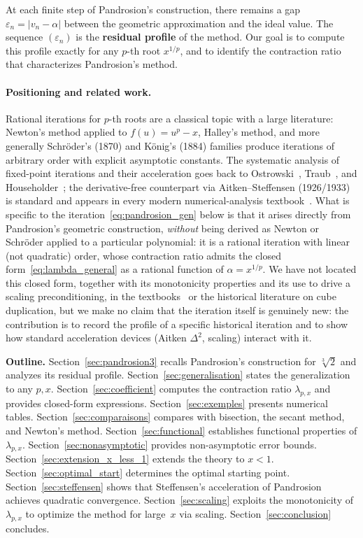 \documentclass[11pt,a4paper]{article}
\theoremstyle{definition}
\newcommand{\cbrt}[1]{\sqrt[3]{#1}}
\newcommand{\eps}{\varepsilon}
\begin{document}
At each finite step of Pandrosion's construction, there remains a gap $\eps_n = |v_n - \alpha|$ between the geometric approximation and the ideal value. The sequence $(\eps_n)$ is the \textbf{residual profile} of the method. Our goal is to compute this profile exactly for any $p$-th root $x^{1/p}$, and to identify the contraction ratio that characterizes Pandrosion's method.

\medskip

\paragraph{Positioning and related work.}
Rational iterations for $p$-th roots are a classical topic with a large literature: Newton's method applied to $f(u) = u^p - x$, Halley's method, and more generally Schröder's (1870) and König's (1884) families produce iterations of arbitrary order with explicit asymptotic constants. The systematic analysis of fixed-point iterations and their acceleration goes back to Ostrowski~\cite{ostrowski}, Traub~\cite{traub}, and Householder~\cite{householder}; the derivative-free counterpart via Aitken--Steffensen (1926/1933) is standard and appears in every modern numerical-analysis textbook~\cite{stoer,numrecipes}.
What is specific to the iteration~\eqref{eq:pandrosion_gen} below is that it arises directly from Pandrosion's geometric construction, \emph{without} being derived as Newton or Schröder applied to a particular polynomial: it is a rational iteration with linear (not quadratic) order, whose contraction ratio admits the closed form~\eqref{eq:lambda_general} as a rational function of $\alpha = x^{1/p}$.
We have not located this closed form, together with its monotonicity properties and its use to drive a scaling preconditioning, in the textbooks~\cite{stoer,numrecipes} or the historical literature on cube duplication, but we make no claim that the iteration itself is genuinely new: the contribution is to record the profile of a specific historical iteration and to show how standard acceleration devices (Aitken $\Delta^2$, scaling) interact with it.

\medskip

\textbf{Outline.} Section~\ref{sec:pandrosion3} recalls Pandrosion's construction for $\cbrt{2}$ and analyzes its residual profile. Section~\ref{sec:generalisation} states the generalization to any $p, x$. Section~\ref{sec:coefficient} computes the contraction ratio $\lambda_{p,x}$ and provides closed-form expressions. Section~\ref{sec:exemples} presents numerical tables. Section~\ref{sec:comparaisons} compares with bisection, the secant method, and Newton's method. Section~\ref{sec:functional} establishes functional properties of $\lambda_{p,x}$. Section~\ref{sec:nonasymptotic} provides non-asymptotic error bounds. Section~\ref{sec:extension_x_less_1} extends the theory to $x < 1$. Section~\ref{sec:optimal_start} determines the optimal starting point. Section~\ref{sec:steffensen} shows that Steffensen's acceleration of Pandrosion achieves quadratic convergence. Section~\ref{sec:scaling} exploits the monotonicity of $\lambda_{p,x}$ to optimize the method for large~$x$ via scaling. Section~\ref{sec:conclusion} concludes.
\end{document}
